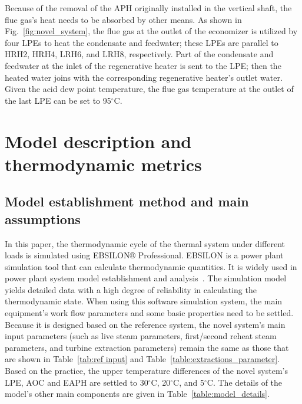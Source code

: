 \documentclass[preprint,12pt]{elsarticle}
\begin{document}
Because of the removal of the APH originally installed in the vertical shaft, the flue gas's heat needs to be absorbed by other means.
As shown in Fig.~\ref{fig:novel_system}, the flue gas at the outlet of the economizer is utilized by four LPEs to heat the condensate and feedwater; these LPEs are parallel to HRH2, HRH4, LRH6, and LRH8, respectively. %
Part of the condensate and feedwater at the inlet of the regenerative heater is sent to the LPE; then the heated water joins with the corresponding regenerative heater's outlet water. 
Given the acid dew point temperature, the flue gas temperature at the outlet of the last LPE can be set to 95$^\circ$C. 


\section{Model description and thermodynamic metrics}
\label{ssub:model_establishment_and_system_analysis_method}

\subsection{Model establishment method and main assumptions}
\label{ssub3:modle description}
In this paper, the thermodynamic cycle of the thermal system under different loads is simulated using EBSILON® Professional.
EBSILON is a power plant simulation tool that can calculate thermodynamic quantities. It is widely used in power plant system model establishment and analysis~\cite{Li2015Integrated,Yao2017Multi}. 
The simulation model yields detailed data with a high degree of reliability in calculating the thermodynamic state.
When using this software simulation system, the main equipment's work flow parameters and some basic properties need to be settled.
Because it is designed based on the reference system, the novel system's main input parameters (such as live steam parameters, first/second reheat steam parameters, and turbine extraction parameters) remain the same as those that are shown in Table~\ref{tab:ref input} and Table~\ref{table:extractions_parameter}.
Based on the practice,
the upper temperature differences of the novel system's LPE, AOC and EAPH are settled to 30$^\circ$C, 20$^\circ$C, and 5$^\circ$C. 
The details of the model's other main components are given in Table~\ref{table:model_details}. 
\end{document}
